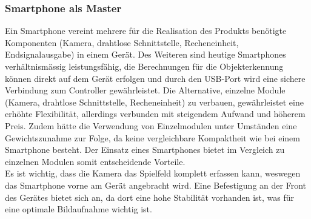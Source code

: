 \subsubsection{Smartphone als Master}
	Ein Smartphone vereint mehrere für die Realisation des Produkts benötigte Komponenten (Kamera, drahtlose Schnittstelle, Recheneinheit, Endsignalausgabe) 
	in einem Gerät. Des Weiteren sind heutige Smartphones verhältnismässig leistungsfähig, die Berechnungen für die Objekterkennung 
	können direkt auf dem Gerät erfolgen und durch den USB-Port wird eine sichere Verbindung zum Controller gewährleistet. Die Alternative, einzelne Module (Kamera, drahtlose Schnittstelle, Recheneinheit) zu verbauen, 
	gewährleistet eine erhöhte Flexibilität, allerdings verbunden mit steigendem Aufwand und höherem Preis. 
	Zudem hätte die Verwendung von Einzelmodulen unter Umständen eine Gewichtszunahme zur Folge, da keine vergleichbare Kompaktheit wie bei einem Smartphone besteht. 
	Der Einsatz eines Smartphones bietet im Vergleich zu einzelnen Modulen somit entscheidende Vorteile.\\
	Es ist wichtig, dass die Kamera das Spielfeld komplett erfassen kann, weswegen das Smartphone vorne am Gerät angebracht wird. 
	Eine Befestigung an der Front des Gerätes bietet sich an, da dort eine hohe Stabilität vorhanden ist, 
	was für eine optimale Bildaufnahme wichtig ist.\\
	
